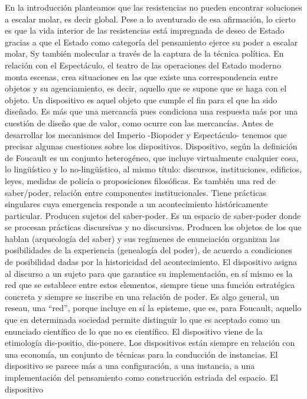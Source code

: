 \documentclass[
]{article}
\begin{document}
En la introducción planteamos que las resistencias no pueden encontrar
soluciones a escalar molar, es decir global. Pese a lo aventurado de esa
afirmación, lo cierto es que la vida interior de las resistencias está
impregnada de deseo de Estado gracias a que el Estado como categoría del
pensamiento ejerce su poder a escalar molar, Sy también molecular a
través de la captura de la técnica política. En relación con el
Espectáculo, el teatro de las operaciones del Estado moderno monta
escenas, crea situaciones en las que existe una correspondencia entre
objetos y su agenciamiento, es decir, aquello que se supone que se haga
con el objeto. Un dispositivo es aquel objeto que cumple el fin para el
que ha sido diseñado. Es más que una mercancía pues condiciona una
respuesta más por una cuestión de diseño que de valor, como ocurre con
las mercancías. Antes de desarrollar los mecanismos del Imperio
-Biopoder y Espectáculo- tenemos que precisar algunas cuestiones sobre
los dispositivos. Dispositivo, según la definición de Foucault es un
conjunto heterogéneo, que incluye virtualmente cualquier cosa, lo
lingüístico y lo no-lingüístico, al mismo título: discursos,
instituciones, edificios, leyes, medidas de policía o proposiciones
filosóficas. Es también una red de saber/poder, relación entre
componentes institucionales. Tiene prácticas singulares cuya emergencia
responde a un acontecimiento históricamente particular. Producen sujetos
del saber-poder. Es un espacio de saber-poder donde se procesan
prácticas discursivas y no discursivas. Producen los objetos de los que
hablan (arqueología del saber) y sus regímenes de enunciación organizan
las posibilidades de la experiencia (genealogía del poder), de acuerdo a
condiciones de posibilidad dadas por la historicidad del acontecimiento.
El dispositivo asigna al discurso a un sujeto para que garantice su
implementación, en sí mismo es la red que se establece entre estos
elementos, siempre tiene una función estratégica concreta y siempre se
inscribe en una relación de poder. Es algo general, un reseau, una
``red'', porque incluye en sí la episteme, que es, para Foucault,
aquello que en determinada sociedad permite distinguir lo que es
aceptado como un enunciado científico de lo que no es científico. El
dispositivo viene de la etimología dis-positio, dis-ponere. Los
dispositivos están siempre en relación con una economía, un conjunto de
técnicas para la conducción de instancias. El dispositivo se parece más
a una configuración, a una instancia, a una implementación del
pensamiento como construcción estriada del espacio. El dispositivo
\end{document}
